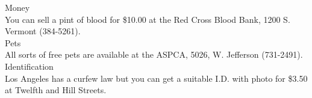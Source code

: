 \documentclass[11pt,twoside,a4paper]{book}
\begin{document}
Money~\\
You can sell a pint of blood for \$10.00 at the Red Cross Blood Bank, 1200 S. Vermont (384-5261).~\\

Pets~\\
All sorts of free pets are available at the ASPCA, 5026, W. Jefferson (731-2491).~\\

Identification~\\
Los Angeles has a curfew law but you can get a suitable I.D. with photo for \$3.50 at Twelfth and Hill Streets. 


\clearpage

% 
\end{document}

